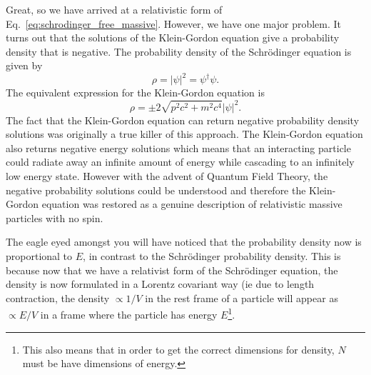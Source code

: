 Great, so we have arrived at a relativistic form of Eq.~\ref{eq:schrodinger_free_massive}. However, we have one major problem. It turns out that the solutions of the Klein-Gordon equation give a probability density that is negative. The probability density of the Schr\"odinger equation is given by
\[\rho=|\psi|^2=\psi^\dagger\psi.\]
The equivalent expression for the Klein-Gordon equation is 
\[\rho=\pm 2\sqrt{p^2c^2+m^2c^4}|\psi|^2.\]
The fact that the Klein-Gordon equation can return negative probability density solutions was originally a true killer of this approach. The Klein-Gordon equation also returns negative energy solutions which means that an interacting particle could radiate away an infinite amount of energy while cascading to an infinitely low energy state. However with the advent of Quantum Field Theory, the negative probability solutions could be understood and therefore the Klein-Gordon equation was restored as a genuine description of relativistic massive particles with no spin. 

The eagle eyed amongst you will have noticed that the probability density now is proportional to $E$, in contrast to the Schr\"odinger probability density. This is because now that we have a relativist form of the Schr\"odinger equation, the density is now formulated in a Lorentz covariant way (ie due to length contraction, the density $\propto 1/V$ in the rest frame of a particle will appear as $\propto E/V$ in a frame where the particle has energy $E$\footnote{This also means that in order to get the correct dimensions for density, $N$ must be have dimensions of energy.}.


